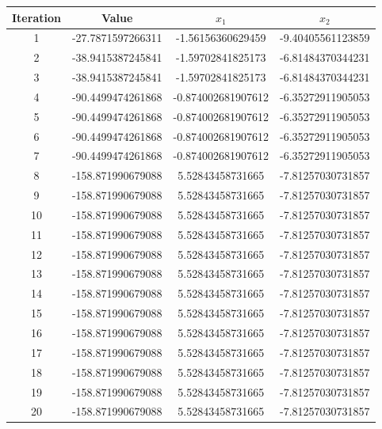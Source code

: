 \documentclass[oneside,12pt,openany]{book}
\begin{document}
    \begin{longtable}[c]{|c|c|c|c|}
        \hline
        \textbf{Iteration} & \textbf{Value} & \textbf{$x_{1}$} & \textbf{$x_{2}$} \\ \hline
        \endhead
        1 & -27.7871597266311 & -1.56156360629459 & -9.40405561123859 \\ \hline
        2 & -38.9415387245841 & -1.59702841825173 & -6.81484370344231 \\ \hline
        3 & -38.9415387245841 & -1.59702841825173 & -6.81484370344231 \\ \hline
        4 & -90.4499474261868 & -0.874002681907612 & -6.35272911905053 \\ \hline
        5 & -90.4499474261868 & -0.874002681907612 & -6.35272911905053 \\ \hline
        6 & -90.4499474261868 & -0.874002681907612 & -6.35272911905053 \\ \hline
        7 & -90.4499474261868 & -0.874002681907612 & -6.35272911905053 \\ \hline
        8 & -158.871990679088 & 5.52843458731665 & -7.81257030731857 \\ \hline
        9 & -158.871990679088 & 5.52843458731665 & -7.81257030731857 \\ \hline
        10 & -158.871990679088 & 5.52843458731665 & -7.81257030731857 \\ \hline
        11 & -158.871990679088 & 5.52843458731665 & -7.81257030731857 \\ \hline
        12 & -158.871990679088 & 5.52843458731665 & -7.81257030731857 \\ \hline
        13 & -158.871990679088 & 5.52843458731665 & -7.81257030731857 \\ \hline
        14 & -158.871990679088 & 5.52843458731665 & -7.81257030731857 \\ \hline
        15 & -158.871990679088 & 5.52843458731665 & -7.81257030731857 \\ \hline
        16 & -158.871990679088 & 5.52843458731665 & -7.81257030731857 \\ \hline
        17 & -158.871990679088 & 5.52843458731665 & -7.81257030731857 \\ \hline
        18 & -158.871990679088 & 5.52843458731665 & -7.81257030731857 \\ \hline
        19 & -158.871990679088 & 5.52843458731665 & -7.81257030731857 \\ \hline
        20 & -158.871990679088 & 5.52843458731665 & -7.81257030731857 \\ \hline

\end{longtable}
\end{document}
